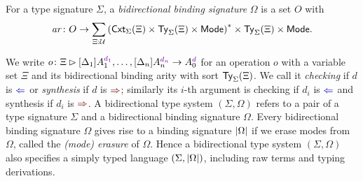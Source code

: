 \begin{definition}
  For a type signature $\Sigma$, a \emph{bidirectional binding signature} $\Omega$ is a set $O$ with
  \[
    \mathit{ar}\colon O \to \sum_{\Xi : \mathcal{U}} \left(\mathsf{Cxt}_{\Sigma}(\Xi) \times \mathsf{Ty}_{\Sigma}(\Xi) \times {\mathsf{Mode}}\right)^* \times \mathsf{Ty}_{\Sigma}(\Xi) \times {\mathsf{Mode}}.
  \]
\end{definition}
We write $\biop$ for an operation $o$ with a variable set $\Xi$ and its bidirectional binding arity with sort $\mathsf{Ty}_{\Sigma}(\Xi)$.
We call it \emph{checking} if $d$ is ${\chk}$ or \emph{synthesis} if $d$ is ${\syn}$; similarly its $i$-th argument is checking if $d_i$ is $\chk$ and synthesis if $d_i$ is $\syn$.
A bidirectional type system $(\Sigma, \Omega)$ refers to a pair of a type signature $\Sigma$ and a bidirectional binding signature $\Omega$.
Every bidirectional binding signature $\Omega$ gives rise to a binding signature $\left|\Omega\right|$ if we erase modes from $\Omega$, called the \emph{(mode) erasure} of $\Omega$.
Hence a bidirectional type system $(\Sigma, \Omega)$ also specifies a simply typed language $(\Sigma, \left|\Omega\right|)$, including raw terms and typing derivations.


